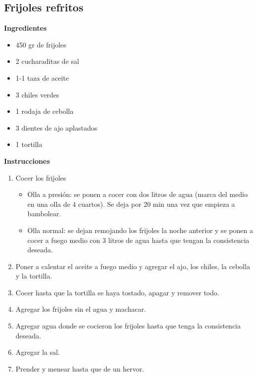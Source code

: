 \subsection{Frijoles refritos}
\label{sec:frijoles-refritos}

\textbf{Ingredientes}
\begin{itemize}
\item 450 gr de frijoles
\item 2 cucharaditas de sal
\item 1-1 taza de aceite
\item 3 chiles verdes
\item 1 rodaja de cebolla
\item 3 dientes de ajo aplastados
\item 1 tortilla
\end{itemize}

\textbf{Instrucciones}
\begin{enumerate}
\item Cocer los frijoles
\begin{itemize}
\item Olla a presión: se ponen a cocer con dos litros de agua (marca del medio en una olla de 4 cuartos). Se deja por 20 min una vez que empieza a bambolear. 
\item Olla normal: se dejan remojando los frijoles la noche anterior y se ponen a cocer a fuego medio con 3 litros de agua hasta que tengan la consistencia deseada.
\end{itemize}
\item Poner a calentar el aceite a fuego medio y agregar el ajo, los chiles, la cebolla y la tortilla. 
\item Cocer hasta que la tortilla se haya tostado, apagar y remover todo.
\item Agregar los frijoles sin el agua y machacar.
\item Agregar agua donde se cocieron los frijoles hasta que tenga la consistencia deseada.
\item Agregar la sal.
\item Prender y menear hasta que de un hervor.
\end{enumerate}
